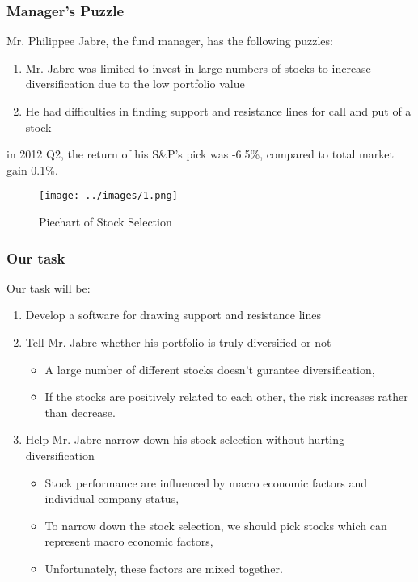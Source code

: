 \documentclass[compress,handout,10pt]{beamer}
\let\olditem\item
\renewcommand{\item}{\setlength{\itemsep}{0.5\baselineskip}\olditem}
\begin{document}
\begin{frame}
    \frametitle{Manager's Puzzle}
Mr. Philippee Jabre, the fund manager, has the following puzzles:
\vspace{7pt}    
\begin{enumerate}
	\item  Mr. Jabre was limited to invest in large numbers of stocks to increase diversification due to the low portfolio value
        \item  He had difficulties in finding support and resistance lines for call and put of a stock
     \end{enumerate} 
\color{red} in 2012 Q2, the return of his S\&P's pick was -6.5\%, compared to total market gain 0.1\%. 
\begin{figure}[h]
    \begin{center}
        \texttt{[image: ../images/1.png]}
    \end{center}
    \caption{Piechart of Stock Selection}
    \label{fig:Piechart}
\end{figure}  
\end{frame}

\begin{frame}
    \frametitle{Our task}
Our task will be: 
\vspace{7pt}    
\begin{enumerate}
\item Develop a software for drawing support and resistance lines
\item Tell Mr. Jabre whether his portfolio is truly diversified or not
\begin{itemize} 
\item A large number of different stocks doesn't gurantee diversification,
\item If the stocks are positively related to each other, the risk increases rather than decrease.
\end{itemize}
\item Help Mr. Jabre narrow down his stock selection without hurting diversification
\begin{itemize} 
\item Stock performance are influenced by macro economic factors and individual company status,
\item To narrow down the stock selection, we should pick stocks which can represent macro economic factors,
\item Unfortunately, these factors are mixed together.
\end{itemize}
\end{enumerate}
\end{frame}
\end{document}
